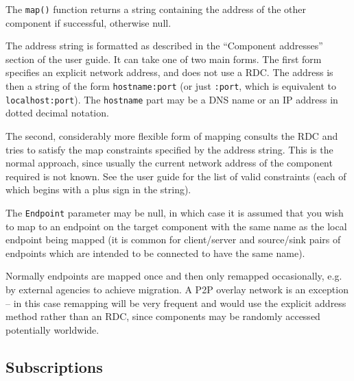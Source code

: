 \documentclass[12pt,a4paper,twoside]{article}
\renewcommand{\_}{\texttt{\symbol{95}}}
\begin{document}
The \verb^map()^ function returns a string containing the address of the
other component if successful, otherwise null.

The address string is formatted as described in the ``Component
addresses'' section of the user guide. It can take one of two
main forms.
The first form specifies an explicit network address, and does not
use a RDC.
The address is then a string of the form \verb^hostname:port^
(or just \verb^:port^, which is equivalent to \verb^localhost:port^).
The \verb^hostname^ part may be a DNS name or an IP address in
dotted decimal notation.

The second, considerably more flexible form of mapping
consults the RDC and tries to satisfy the map constraints
specified by the address string.
This is the normal approach, since usually the current network address
of the component required is not known.
See the user guide for the list of valid constraints (each of which
begins with a plus sign in the string).

The \verb^Endpoint^ parameter may be null, in which case it is
assumed that you wish to map to an endpoint on the target component
with the same name as the local endpoint being mapped (it is common
for client/server and source/sink pairs of endpoints which are
intended to be connected to have the same name).

Normally endpoints are mapped once and then only remapped occasionally,
e.g. by external agencies to achieve migration. A P2P overlay network
is an exception -- in this case remapping will be very frequent
and would use the explicit address method rather than an RDC, since
components may be randomly accessed potentially worldwide.

%
%

\subsection{Subscriptions}
\end{document}
